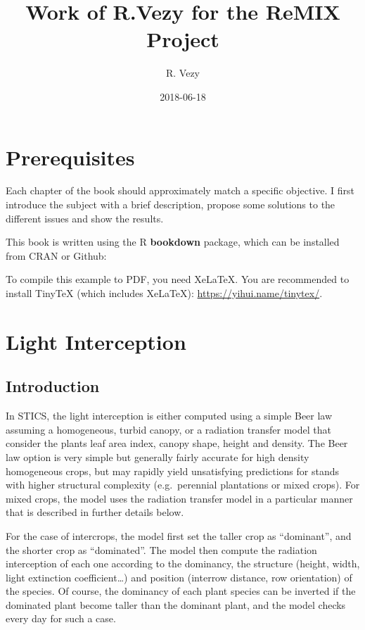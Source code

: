 \documentclass[]{book}
\title{Work of R.Vezy for the ReMIX Project}
\author{R. Vezy}
\date{2018-06-18}
\theoremstyle{definition}
\theoremstyle{definition}
\theoremstyle{definition}
\theoremstyle{remark}
\begin{document}
\maketitle

{
\setcounter{tocdepth}{1}
\tableofcontents
}
\chapter{Prerequisites}\label{prerequisites}

Each chapter of the book should approximately match a specific
objective. I first introduce the subject with a brief description,
propose some solutions to the different issues and show the results.

This book is written using the R \textbf{bookdown} package, which can be
installed from CRAN or Github:

To compile this example to PDF, you need XeLaTeX. You are recommended to
install TinyTeX (which includes XeLaTeX):
\url{https://yihui.name/tinytex/}.

\chapter{Light Interception}\label{Light}

\section{Introduction}\label{introduction}

In STICS, the light interception is either computed using a simple Beer
law assuming a homogeneous, turbid canopy, or a radiation transfer model
that consider the plants leaf area index, canopy shape, height and
density. The Beer law option is very simple but generally fairly
accurate for high density homogeneous crops, but may rapidly yield
unsatisfying predictions for stands with higher structural complexity
(e.g.~perennial plantations or mixed crops). For mixed crops, the model
uses the radiation transfer model in a particular manner that is
described in further details below.

For the case of intercrops, the model first set the taller crop as
``dominant'', and the shorter crop as ``dominated''. The model then
compute the radiation interception of each one according to the
dominancy, the structure (height, width, light extinction
coefficient\ldots{}) and position (interrow distance, row orientation)
of the species. Of course, the dominancy of each plant species can be
inverted if the dominated plant become taller than the dominant plant,
and the model checks every day for such a case.
\end{document}
